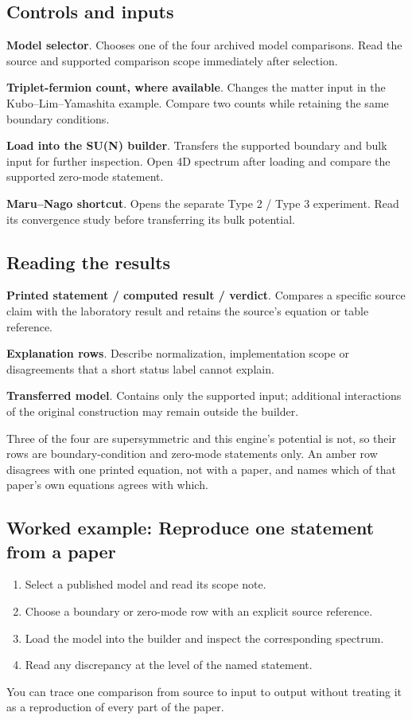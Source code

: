 \documentclass[11pt,a4paper]{article}
\begin{document}
\subsection*{Controls and inputs}
\textbf{Model selector}. Chooses one of the four archived model comparisons. Read the source and supported comparison scope immediately after selection.

\textbf{Triplet-fermion count, where available}. Changes the matter input in the Kubo--Lim--Yamashita example. Compare two counts while retaining the same boundary conditions.

\textbf{Load into the SU(N) builder}. Transfers the supported boundary and bulk input for further inspection. Open 4D spectrum after loading and compare the supported zero-mode statement.

\textbf{Maru--Nago shortcut}. Opens the separate Type 2 / Type 3 experiment. Read its convergence study before transferring its bulk potential.

\subsection*{Reading the results}
\textbf{Printed statement / computed result / verdict}. Compares a specific source claim with the laboratory result and retains the source's equation or table reference.

\textbf{Explanation rows}. Describe normalization, implementation scope or disagreements that a short status label cannot explain.

\textbf{Transferred model}. Contains only the supported input; additional interactions of the original construction may remain outside the builder.

Three of the four are supersymmetric and this engine's potential is not, so their rows are boundary-condition and zero-mode statements only. An amber row disagrees with one printed equation, not with a paper, and names which of that paper's own equations agrees with which.
\subsection*{Worked example: Reproduce one statement from a paper}
\begin{enumerate}
\item Select a published model and read its scope note.
\item Choose a boundary or zero-mode row with an explicit source reference.
\item Load the model into the builder and inspect the corresponding spectrum.
\item Read any discrepancy at the level of the named statement.
\end{enumerate}
You can trace one comparison from source to input to output without treating it as a reproduction of every part of the paper.
\end{document}
